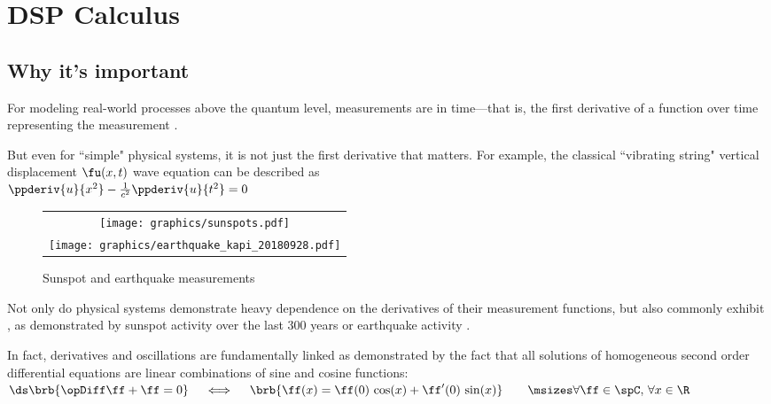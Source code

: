\chapter{DSP Calculus}

\section{Why it's important}
For modeling real-world processes above the quantum level, measurements are  in time---that is,
the first derivative of a function over time representing the measurement .

But even for ``simple" physical systems, it is not just the first derivative that matters.
For example, the classical ``vibrating string" vertical displacement $\fu(x,t)$ wave equation can be described as
        \\\indentx$\ppderiv{u}{x^2} - \frac{1}{c^2}\ppderiv{u}{t^2} = 0$\\

\begin{figure}
  \centering
  \begin{tabular}{c}
    \texttt{[image: graphics/sunspots.pdf]}\\
    \texttt{[image: graphics/earthquake\_kapi\_20180928.pdf]}
  \end{tabular}
  \caption{Sunspot and earthquake measurements\label{fig:sunspot}}
\end{figure}
Not only do physical systems demonstrate heavy dependence on the derivatives of their measurement functions,
but also commonly exhibit , as demonstrated by sunspot activity over the last 300 years or
earthquake activity .

In fact, derivatives and oscillations are fundamentally linked
as demonstrated by the fact that 
all solutions of homogeneous second order differential equations
        are linear combinations of sine and cosine functions:
        \\\indentx$\ds  \brb{\opDiff\ff + \ff=0}
  \quad\iff\quad
  \brb{\ff(x) = \ff(0)\,\cos(x) + \ff^\prime(0)\,\sin(x)}
  \qquad\msizes\forall\ff\in\spC,\,\forall x\in\R$

